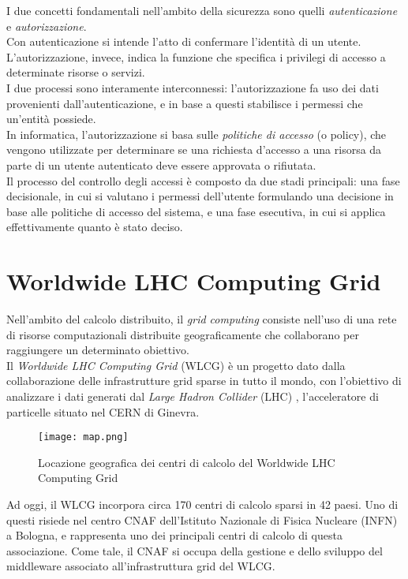 I due concetti fondamentali nell'ambito della
 sicurezza sono quelli \textit{autenticazione} e \textit{autorizzazione}.
 \\ Con autenticazione si intende l'atto di confermare l'identità di un utente. 
 L'autorizzazione, invece, indica la funzione che specifica i privilegi di accesso a determinate risorse o servizi.
\\I due processi sono interamente interconnessi: l'autorizzazione fa uso dei dati provenienti 
dall'autenticazione, e in base a questi stabilisce i 
permessi che un'entità possiede.
\\ In informatica, l'autorizzazione si basa sulle \textit{politiche di accesso} (o policy), che vengono utilizzate per determinare se 
una richiesta d'accesso a una risorsa da parte di un utente autenticato deve essere approvata o rifiutata.
\\ Il processo del controllo degli accessi è composto da due stadi principali: una fase decisionale, in cui si valutano i permessi dell'utente 
 formulando una decisione in base alle politiche di accesso del sistema,
e una fase esecutiva, in cui si applica effettivamente quanto è stato deciso. 

\section{Worldwide LHC Computing Grid}
Nell'ambito del calcolo distribuito, il \textit{grid computing} consiste 
nell'uso di una rete di risorse computazionali distribuite geograficamente che collaborano 
per raggiungere un determinato obiettivo.
\\ Il \textit{Worldwide LHC Computing Grid} (WLCG) \cite{wlcg_doc} è un progetto dato dalla collaborazione 
delle infrastrutture grid sparse in tutto il mondo, con l'obiettivo
di analizzare i dati generati dal \textit{Large Hadron Collider} (LHC) \cite{cern_lhc}, 
l'acceleratore di particelle situato nel CERN di Ginevra. 
\begin{figure}[h]
    \texttt{[image: map.png]}
    \centering
    \caption{Locazione geografica dei centri di calcolo del Worldwide LHC Computing Grid}
    \label{mappa}
\end{figure}

Ad oggi, il WLCG incorpora circa 170 centri di calcolo sparsi in 42 paesi. 
Uno di questi risiede nel centro CNAF dell'Istituto Nazionale di Fisica Nucleare (INFN) \cite{infn_cnaf} a Bologna, e
 rappresenta uno dei principali centri di calcolo di questa associazione. Come tale, il CNAF si occupa
  della gestione e dello sviluppo del middleware associato all'infrastruttura grid del WLCG. 


